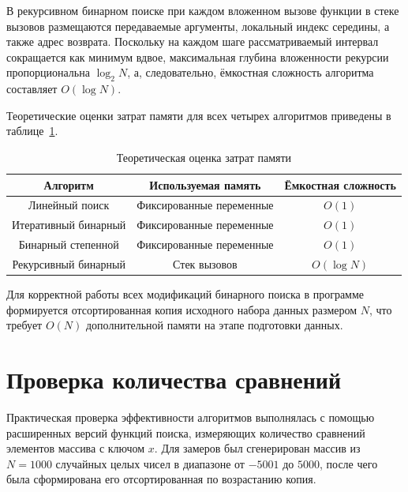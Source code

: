 В рекурсивном бинарном поиске при каждом вложенном вызове 
функции в стеке вызовов размещаются передаваемые аргументы, 
локальный индекс середины, а также адрес возврата. Поскольку 
на каждом шаге рассматриваемый интервал сокращается как минимум 
вдвое, максимальная глубина вложенности рекурсии 
пропорциональна $\log_2 N$, а, следовательно, ёмкостная 
сложность алгоритма составляет $O(\log N)$.

Теоретические оценки затрат памяти для всех четырех 
алгоритмов приведены в таблице~\ref{tab:memory_est}.

\begin{table}[h!]
    \centering
    \begin{threeparttable}
        \caption{Теоретическая оценка затрат памяти}
        \label{tab:memory_est}
        \begin{tabular}{|c|c|c|}
            \hline
            Алгоритм & Используемая память & Ёмкостная сложность \\
            \hline
            Линейный поиск & Фиксированные переменные & $O(1)$ \\
            \hline
            Итеративный бинарный & Фиксированные переменные & $O(1)$ \\
            \hline
            Бинарный степенной & Фиксированные переменные & $O(1)$ \\
            \hline
            Рекурсивный бинарный & Стек вызовов & $O(\log N)$ \\
            \hline
        \end{tabular}
    \end{threeparttable}
\end{table}

Для корректной работы всех модификаций бинарного поиска в 
программе формируется отсортированная копия исходного набора 
данных размером $N$, что требует $O(N)$ дополнительной памяти 
на этапе подготовки данных.

\section{Проверка количества сравнений}

Практическая проверка эффективности алгоритмов выполнялась с 
помощью расширенных версий функций поиска, измеряющих 
количество сравнений элементов массива с ключом $x$. 
Для замеров был сгенерирован 
массив из $N = 1000$ случайных целых чисел в 
диапазоне от $-5001$ до $5000$, после чего была 
сформирована его отсортированная по возрастанию копия.

